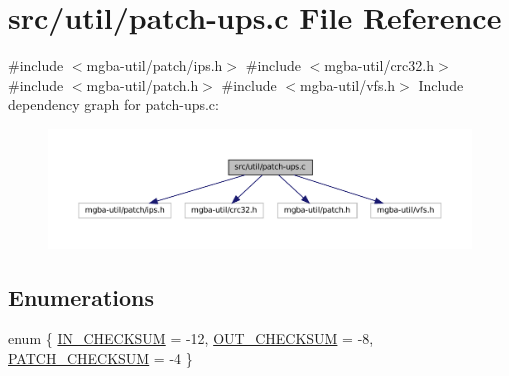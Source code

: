 \hypertarget{patch-ups_8c}{}\section{src/util/patch-\/ups.c File Reference}
\label{patch-ups_8c}
{\ttfamily \#include $<$mgba-\/util/patch/ips.\+h$>$}\newline
{\ttfamily \#include $<$mgba-\/util/crc32.\+h$>$}\newline
{\ttfamily \#include $<$mgba-\/util/patch.\+h$>$}\newline
{\ttfamily \#include $<$mgba-\/util/vfs.\+h$>$}\newline
Include dependency graph for patch-\/ups.c\+:
\nopagebreak
\begin{figure}[H]
\begin{center}
\leavevmode
\includegraphics[width=350pt]{patch-ups_8c__incl}
\end{center}
\end{figure}
\subsection*{Enumerations}
\begin{DoxyCompactItemize}
\item 
enum \{ \mbox{\hyperlink{patch-ups_8c_af715e26dfffd1f8de1c18449e2770cffa49420c7c3a751b2ca0c39a615ecd0376}{I\+N\+\_\+\+C\+H\+E\+C\+K\+S\+UM}} = -\/12, 
\mbox{\hyperlink{patch-ups_8c_af715e26dfffd1f8de1c18449e2770cffa948916e0e1d98aa8bc1d658ae49cf1be}{O\+U\+T\+\_\+\+C\+H\+E\+C\+K\+S\+UM}} = -\/8, 
\mbox{\hyperlink{patch-ups_8c_af715e26dfffd1f8de1c18449e2770cffa429d0b2daf7cf823c93c928399acdd83}{P\+A\+T\+C\+H\+\_\+\+C\+H\+E\+C\+K\+S\+UM}} = -\/4
 \}
\end{DoxyCompactItemize}

